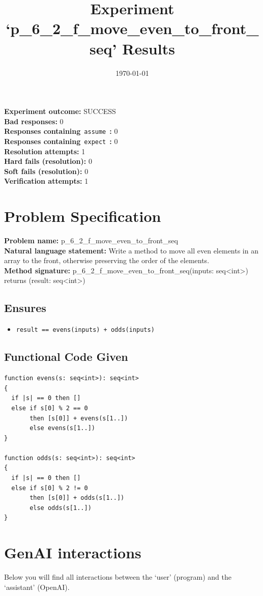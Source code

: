 \documentclass{article}
\begin{document}
\title{Experiment `p\_6\_2\_f\_move\_even\_to\_front\_seq' Results}
\author{\today}
\date{}
\maketitle
\textbf{Experiment outcome: }SUCCESS
\\\textbf{Bad responses: }0
\\\textbf{Responses containing}~\texttt{assume}~\textbf{: }0
\\\textbf{Responses containing}~\texttt{expect}~\textbf{: }0
\\\textbf{Resolution attempts: }1
\\\textbf{Hard fails (resolution): }0
\\\textbf{Soft fails (resolution): }0
\\\textbf{Verification attempts: }1
\section*{Problem Specification}
\textbf{Problem name: }p\_6\_2\_f\_move\_even\_to\_front\_seq
\\\textbf{Natural language statement: }Write a method to move all even elements in an array to the front, otherwise preserving the order of the elements.
\\\textbf{Method signature: }p\_6\_2\_f\_move\_even\_to\_front\_seq(inputs: seq<int>) returns (result: seq<int>)
\subsection*{Ensures}
\begin{itemize}
\item \texttt{result == evens(inputs) + odds(inputs)}
\end{itemize}
\subsection*{Functional Code Given}
\begin{lstlisting}
function evens(s: seq<int>): seq<int>
{
  if |s| == 0 then []
  else if s[0] % 2 == 0
       then [s[0]] + evens(s[1..])
       else evens(s[1..])
}

function odds(s: seq<int>): seq<int>
{
  if |s| == 0 then []
  else if s[0] % 2 != 0
       then [s[0]] + odds(s[1..])
       else odds(s[1..])
}
\end{lstlisting}
\clearpage
\section*{GenAI interactions}
Below you will find all interactions between the `user' (program) and the `assistant' (OpenAI).
\end{document}
